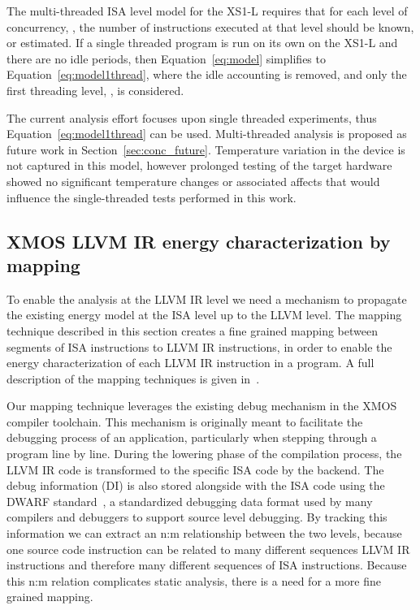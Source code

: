 \documentclass[9pt,preprint]{sigplanconf}
\newcommand{\secref}[1]{Section~\ref{sec:#1}}
\begin{document}
The multi-threaded ISA level model for the XS1-L requires that for each level of
concurrency, , the number of instructions executed at that level should be
known, or estimated. If a single threaded program is run on its own on the XS1-L
and there are no idle periods, then Equation~\ref{eq:model} simplifies to
Equation~\ref{eq:model1thread}, where the idle accounting is removed, and only
the first threading level, , is considered.



The current analysis effort focuses upon single threaded experiments, thus
Equation~\ref{eq:model1thread} can be used. Multi-threaded analysis is proposed
as future work in \secref{conc_future}. Temperature variation in the device is
not captured in this model, however prolonged testing of the target hardware
showed no significant temperature changes or associated affects that would
influence the single-threaded tests performed in this work.


\subsection{XMOS LLVM IR energy characterization by mapping}
\label{sec:mapping}
To enable the analysis at the LLVM IR level we need a mechanism to propagate
the existing energy model at the ISA level up to the LLVM level. The mapping
technique described in this section creates a fine grained
mapping between segments of ISA instructions to LLVM IR instructions, in order
to enable the energy characterization of each LLVM IR instruction in a program.
A full description of the mapping techniques is given in~\cite{Georgiou14}.

Our mapping technique leverages the existing debug mechanism in the XMOS compiler
toolchain. This mechanism is originally meant to
facilitate the debugging process of an application, particularly when stepping
through a program line by line.
During the lowering phase of the compilation process, the LLVM
IR code is transformed to the specific ISA code by the
backend. The debug information (DI) is also stored alongside with the ISA
code using the DWARF standard~\cite{DWARF:2013:Online}, a standardized
debugging data format used by many compilers and debuggers to support source level
debugging.
By tracking this information we can extract an n:m relationship between the two levels, because one
source code instruction can be related to many different sequences LLVM IR instructions and therefore
many different sequences of ISA instructions. Because this n:m relation complicates static
analysis, there is a need for a more fine grained mapping.
\end{document}
